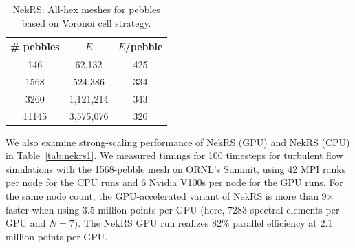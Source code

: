 \documentclass{anstrans}
\begin{document}
 \begin{table} \centering \small
  \begin{tabular}{ccc} \hline \hline
   \# pebbles & $E$ & $E$/pebble \\ \hline
  146 & 62,132 & 425 \\
  1568 & 524,386 & 334 \\
  3260 & 1,121,214 & 343 \\
  11145 & 3,575,076 & 320 \\ \hline \hline
 \end{tabular}%
  \caption{NekRS: All-hex meshes for pebbles based on Voronoi cell strategy.}
  \label{tab:pebble}
 \end{table}

\medskip
We also examine strong-scaling performance of NekRS (GPU) and NekRS
(CPU) in Table~\ref{tab:nekrs1}. We measured timings for 100 timesteps for
turbulent flow simulations with the 1568-pebble mesh on ORNL's Summit, using 42
MPI ranks per node for the CPU runs and 6 Nvidia V100s per node for the GPU
runs. For the same node count, the GPU-accelerated variant of NekRS is more
than 9$\times$ faster when using 3.5 million points per GPU (here, 7283
spectral elements per GPU and $N=7$). The NekRS GPU run realizes 82\%
parallel efficiency at 2.1 million points per GPU.
\end{document}
